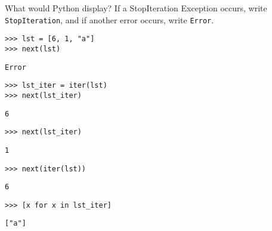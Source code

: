 \question What would Python display? If a StopIteration Exception
occurs, write \texttt{StopIteration}, and if another error occurs,
write \texttt{Error}.

\begin{lstlisting}
>>> lst = [6, 1, "a"]
>>> next(lst)
\end{lstlisting}
\begin{solution}[.25in]
\begin{lstlisting}
Error
\end{lstlisting}
\end{solution}

\begin{lstlisting}
>>> lst_iter = iter(lst)
>>> next(lst_iter)
\end{lstlisting}
\begin{solution}[.25in]
\begin{lstlisting}
6
\end{lstlisting}
\end{solution}

\begin{lstlisting}
>>> next(lst_iter)
\end{lstlisting}
\begin{solution}[.25in]
\begin{lstlisting}
1
\end{lstlisting}
\end{solution}

\begin{lstlisting}
>>> next(iter(lst))
\end{lstlisting}
\begin{solution}[.25in]
\begin{lstlisting}
6
\end{lstlisting}
\end{solution}

\begin{lstlisting}
>>> [x for x in lst_iter]
\end{lstlisting}
\begin{solution}[.25in]
\begin{lstlisting}
["a"]
\end{lstlisting}
\end{solution}

